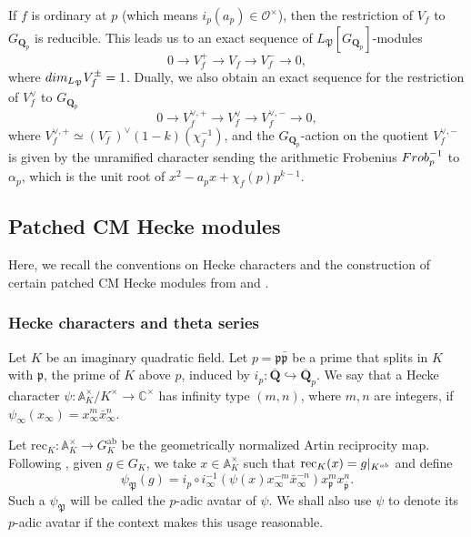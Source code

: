 \documentclass[10pt,letterpaper]{amsart}
\theoremstyle{plain}
\theoremstyle{definition}
\theoremstyle{definition}
\theoremstyle{plain}
\theoremstyle{plain}
\theoremstyle{plain}
\theoremstyle{remark}
\numberwithin{equation}{section}
\newcommand{\pp}{\mathfrak{p}}
\newcommand{\ppbar}{\bar{\mathfrak{p}}}
\DeclareMathOperator{\pa}{\mathfrak{p}}
\DeclareMathOperator{\p}{\mathfrak{P}}
\def\cO{\mathcal O}
\newcommand{\Q}{\mathbf{Q}}
\begin{document}
If $f$ is ordinary at $p$ (which means $i_p(a_p)\in\cO^\times$), then the restriction of $V_f$ to $G_{\Q_p}$ is reducible. This leads us to an exact sequence of $L_{\mathfrak{P}}[G_{\Q_p}]$-modules
\begin{equation*}
0\rightarrow V_f^{+}\rightarrow V_f\rightarrow V_f^{-}\rightarrow 0, 
\end{equation*}
where ${\rm dim}_{L_\mathfrak{P}}V_f^{\pm}=1$. Dually, we also obtain an exact sequence for the restriction of $V_f^{\vee}$ to $G_{\Q_p}$
\begin{equation}\label{subsec:p-ord}
0\rightarrow V_f^{\vee,+}\rightarrow V_f^{\vee}\rightarrow V_f^{\vee,-}\rightarrow 0, 
\end{equation}
where $V_f^{\vee,+}\simeq(V_f^-)^\vee(1-k)(\chi_f^{-1})$, and the $G_{\Q_p}$-action on the quotient $V_{f}^{\vee,-}$ is given by the unramified character sending the arithmetic Frobenius ${\rm Frob}_p^{-1}$ to $\alpha_p$, which is the unit root of $x^2-a_px+\chi_f(p)p^{k-1}$.



\subsection{Patched CM Hecke modules}\label{LLZ-K}

Here, we recall the conventions on Hecke characters and the construction of certain patched CM Hecke modules from \cite[Sec.\,1.3]{CD} and \cite{LLZ-K}.

\subsubsection{Hecke characters and theta series }\label{theta}

Let $K$ be an imaginary quadratic field. Let $p=\pp\ppbar$ be a prime that splits in $K$ with $\pp$, the prime of $K$ above $p$, induced by $i_p:\overline{\Q}\hookrightarrow\overline{\Q}_p$. We say that a Hecke character $\psi:\mathbb{A}_K^{\times}/K^{\times}\rightarrow \mathbb{C}^{\times}$ has infinity type $(m,n)$, where $m,n$ are integers, if $\psi_{\infty}(x_{\infty})=x_{\infty}^m\bar{x}_{\infty}^n$. 

Let $\text{rec}_K:\mathbb{A}_K^{\times}\rightarrow G_K^{\text{ab}}$ be the geometrically normalized Artin reciprocity map. Following \cite[Sec.\,1.3.1]{CD}, given $g\in G_K$, we take $x\in\mathbb{A}_K^{\times}$ such that $\text{rec}_K(x)=g\vert_{K^{\rm ab}}$ and define
\begin{equation}
        \psi_{\p}(g)=i_p\circ i_{\infty}^{-1}(\psi(x)x_{\infty}^{-m}\bar{x}_{\infty}^{-n})x_{\pa}^m x_{\bar{\pa}}^n.\nonumber
\end{equation}
Such a $\psi_{\p}$ will be called the $p$-adic avatar of $\psi$. We shall also use $\psi$ to denote its $p$-adic avatar if the context makes this usage reasonable.
\end{document}
